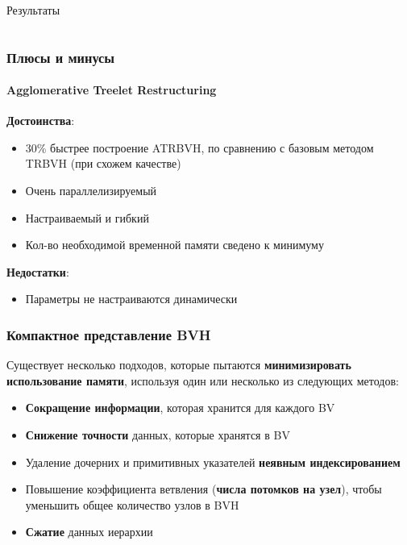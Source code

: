 \documentclass{beamer}
\begin{document}
\begin{frame}[t]{Результаты}
\begin{columns}
    \end{columns}

    \begin{center}
    \end{center}
\end{frame}

\begin{frame}[t]
    \frametitle{Плюсы и минусы}
    \framesubtitle{Agglomerative Treelet Restructuring}
    \textbf{Достоинства}:
    \begin{itemize}
        \item
            30\% быстрее построение ATRBVH, по сравнению с базовым методом TRBVH (при схожем качестве)
        \item
            Очень параллелизируемый
        \item
            Настраиваемый и гибкий
        \item
            Кол-во необходимой временной памяти сведено к минимуму
    \end{itemize}
    \textbf{Недостатки}:
    \begin{itemize}
        \item
            Параметры не настраиваются динамически
    \end{itemize}
\end{frame}

\begin{frame}[t]
    \frametitle{Компактное представление BVH}
    Существует несколько подходов, которые пытаются \textbf{минимизировать использование памяти}, используя один или несколько из следующих методов:
    \begin{itemize}
        \item
            \textbf{Сокращение информации}, которая хранится для каждого BV
        \item
            \textbf{Снижение точности} данных, которые хранятся в BV
        \item
            Удаление дочерних и примитивных указателей \textbf{неявным индексированием}
        \item
            Повышение коэффициента ветвления (\textbf{числа потомков на узел}), чтобы уменьшить общее количество узлов в BVH
        \item
            \textbf{Сжатие} данных иерархии
    \end{itemize}

\end{frame}
\end{document}
